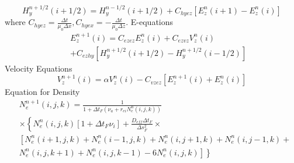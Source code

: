 \documentclass[a4paper,10pt]{article}
\begin{document}
\begin{equation}
H_{y}^{n+1/2}(i+1/2)=H_{y}^{n-1/2}(i+1/2) +C_{hyez}\left[E_{z}^{n}(i+1)-E_{z}^{n}(i)\right] 
\end{equation}
where $C_{hyez}=\frac{\Delta t}{\mu_{0}\Delta x},C_{hyex}=-\frac{\Delta t}{\mu_{0}\Delta z}$.\newline
E-equations
\begin{eqnarray}
&& E_{z}^{n+1}(i)=C_{ezez} E_{z}^{n}(i)+C_{ezvz} V_{z}^{n}(i)\nonumber\\
&& +C_{ezhy}\left[H_{y}^{n+1/2}(i+1/2)-H_{y}^{n+1/2}(i-1/2)\right]
\end{eqnarray}
Velocity Equations
\begin{equation}
V_{z}^{n+1}(i)=\alpha V_{z}^{n}(i)-C_{vzez}\left[E_{z}^{n+1}(i)+E_{z}^{n}(i)\right]
\end{equation}
Equation for Density
\begin{equation}
\begin{aligned}
& N^{n+1}_{e}(i,j,k)=\frac{1}{1+\Delta t_{F}(\nu_{a}+r_{ei}N^{n}_{e}(i,j,k))} \\
& \times \left\lbrace N^{n}_{e}(i,j,k)\left[1+\Delta t_{F} \nu_{i}\right]+\frac{D_{eff}\Delta t_{F}}{\Delta s^{2}_{F}}  \times \right. \\
& \left. \left[ N^{n}_{e}(i+1,j,k)+N^{n}_{e}(i-1,j,k)+
N^{n}_{e}(i,j+1,k)+N^{n}_{e}(i,j-1,k)+\right.\right. \\
& \left. \left.
N^{n}_{e}(i,j,k+1)+N^{n}_{e}(i,j,k-1)-6N^{n}_{e}(i,j,k)\right]
\right\rbrace \\
\end{aligned}
\end{equation}
\end{document}
